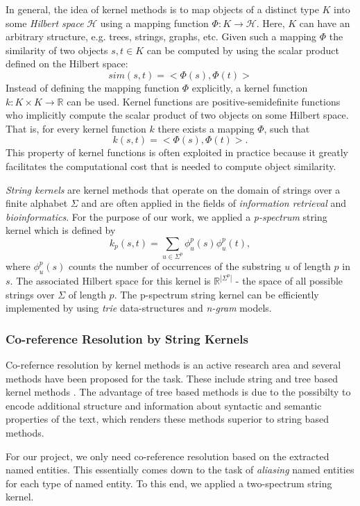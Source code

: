 In general, the idea of kernel methods is to map objects of a
distinct type $K$ into some \textit{Hilbert space} $\mathcal{H}$ using a mapping function $\Phi :
K \rightarrow \mathcal{H}$. Here, $K$ can have an arbitrary structure, e.g. trees, strings,
graphs, etc. Given such a mapping $\Phi$ the similarity of two objects $s,t \in K$ can be computed
by using the scalar product defined on the Hilbert space:
\[sim(s,t) = <\Phi(s),\Phi(t)>\]
Instead of defining the mapping function $\Phi$ explicitly, a kernel function $k : K \times K
\rightarrow \mathbb{R}$ can be used. Kernel functions are positive-semidefinite functions
who implicitly compute the scalar product of two objects on some Hilbert space. That is, for every
kernel function $k$ there exists a mapping $\Phi$, such that
\[k(s,t) = <\Phi(s),\Phi(t)>.\]
This property of kernel functions is often exploited in practice because it greatly facilitates the
computational cost that is needed to compute object similarity.

\textit{String kernels} are kernel methods  that operate on the domain of strings over
a finite alphabet $\Sigma$ and are often applied in the fields of \textit{information
retrieval} and \textit{bioinformatics}. For the purpose of our work, we applied a
\textit{p-spectrum} string kernel  which is defined by
\[k_p(s,t) = \sum_{u \in \Sigma^p}{\phi_u^p(s)\phi_u^p(t)},\]
where $\phi_u^p(s)$ counts the number of occurrences of the substring $u$ of length $p$ in $s$. The
associated Hilbert space for this kernel is $\mathbb{R}^{|\Sigma^p|}$ - the space of all possible
strings over $\Sigma$ of length $p$. The p-spectrum string kernel can be efficiently implemented by using \textit{trie} data-structures and \textit{n-gram} models.

\subsubsection{Co-reference Resolution by String Kernels}
\label{sec:co_reference_resolution_by_string_kernels}
Co-refernce resolution by kernel methods is an active research area and several methods have been proposed for the task. These include string and tree based kernel methods \cite{string_kernel_coref}.
The advantage of tree based methods is due to the possibilty to encode additional structure and information about syntactic and semantic properties of the text, which renders these methods superior to string based methods.

For our project, we only need co-reference resolution based on the extracted named entities. This essentially comes down to the task of \textit{aliasing} named entities for each type of named entity. To this end, we applied a two-spectrum string kernel. 

